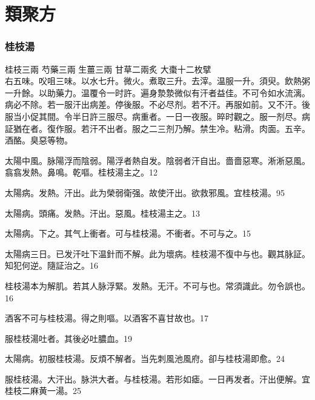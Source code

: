 






\maketitle

\tableofcontents%

\part{類聚方}

\section{桂枝湯}

桂枝{\scriptsize 三兩} 芍藥{\scriptsize 三兩} 生薑{\scriptsize 三兩} 甘草{\scriptsize 二兩炙} 大棗{\scriptsize 十二枚擘}\\
右五味。㕮咀三味。以水七升。微火。煮取三升。去滓。温服一升。須臾。飲熱粥一升餘。以助藥力。温覆令一时許。遍身漐漐微似有汗者益佳。不可令如水流漓。病必不除。若一服汗出病差。停後服。不必尽剂。若不汗。再服如前。又不汗。後服当小促其間。令半日許三服尽。病重者。一日一夜服。晬时觀之。服一剂尽。病証猶在者。復作服。若汗不出者。服之二三剂乃解。{\khaaitp 禁生冷。粘滑。肉面。五辛。酒酪。臭惡等物。}

太陽中風。{\khaaitp 脉}陽浮而陰弱。陽浮者熱自发。陰弱者汗自出。嗇嗇惡寒。淅淅惡風。翕翕发熱。鼻鳴。乾嘔。桂枝湯主之。12

太陽病。发熱。汗出。此为榮弱衛强。故使汗出。欲救邪風。宜桂枝湯。95

太陽病。頭痛。发熱。汗出。惡風。桂枝湯主之。13

太陽病。下之。其气上衝者。可与桂枝湯。不衝者。不可与之。15

太陽病三日。已发汗吐下温針而不解。此为壞病。桂枝湯不復中与也。觀其脉証。知犯何逆。隨証治之。16

桂枝湯本为解肌。若其人脉浮緊。发熱。无汗。不可与也。常須識此。勿令誤也。16

酒客不可与桂枝湯。得之則嘔。以酒客不喜甘故也。17

服桂枝湯吐者。其後必吐膿血。19

太陽病。初服桂枝湯。反煩不解者。当先刺風池風府。卻与桂枝湯即愈。24

服桂枝湯。大汗出。脉洪大者。与桂枝湯。若形如瘧。一日再发者。汗出便解。宜桂枝二麻黄一湯。25

